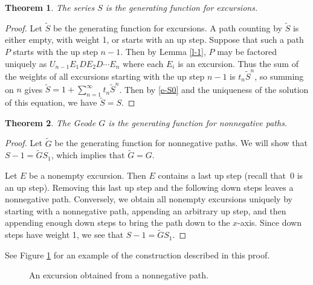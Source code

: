 \documentclass[12pt,reqno, oneside]{amsart}
\newtheorem{thm}{Theorem}[section]
\newcommand{\St}{\tilde S}
\newcommand{\Gt}{\tilde G}
\begin{document}
\begin{thm}
\label{t-S}
The series $S$ is the generating function for excursions.
\end{thm}

\begin{proof}
Let $\St$ be the generating function for excursions. A path counting by $\St$ is either empty, with weight 1, or starts with an up step. Suppose that such a path $P$ starts with the up step $n-1$.  Then by Lemma \ref{l-1}, $P$ may be factored uniquely as  $U_{n-1}E_1DE_2D\cdots E_n$ 
where each $E_i$ is an excursion.
Thus the sum of the weights of all excursions starting with the up step $n-1$ is $t_n \St^n$, so summing on $n$ gives
$\St= 1+\sum_{n=1}^\infty t_n {\St}^n$. Then by \eqref{e-S0} and the uniqueness of the solution of this equation,  we have $\St=S$.
\end{proof}



\begin{thm} 
\label{t-Gthm}
The Geode  $G$ is the generating function for  nonnegative paths.
\end{thm}
\begin{proof}
Let $\Gt$ be the generating function for nonnegative paths. We will show that $S-1=\Gt S_1$, which implies that $\Gt=G$.

Let $E$ be a nonempty excursion. Then $E$ contains a last up step (recall that~$0$ is an up step).
Removing this last up step and the following down steps leaves a nonnegative path. Conversely, we obtain all nonempty excursions 
uniquely by starting with a nonnegative path, appending an arbitrary up step, and then appending enough down steps to bring the path down to the $x$-axis. Since down steps have weight 1, we see that $S-1=\Gt S_1$.
\end{proof}

See Figure \ref{f-Gfac} for an example of the construction described in this proof.


\begin{figure}[h]
\caption{An excursion obtained from a nonnegative path.}
\label{f-Gfac}
\end{figure}
\end{document}
